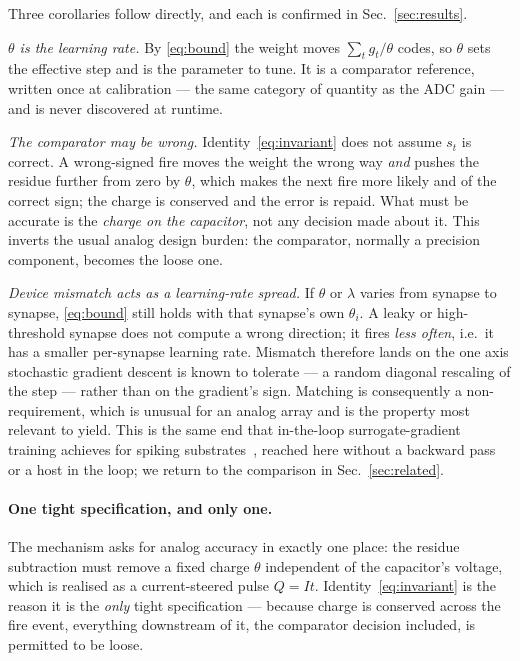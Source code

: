 \documentclass[11pt]{article}
\begin{document}
Three corollaries follow directly, and each is confirmed in Sec.~\ref{sec:results}.

\emph{$\theta$ is the learning rate.} By \eqref{eq:bound} the weight moves $\sum_t g_t/\theta$ codes,
so $\theta$ sets the effective step and is the parameter to tune. It is a comparator reference,
written once at calibration --- the same category of quantity as the ADC gain --- and is never
discovered at runtime.

\emph{The comparator may be wrong.} Identity~\eqref{eq:invariant} does not assume $s_t$ is correct. A
wrong-signed fire moves the weight the wrong way \emph{and} pushes the residue further from zero by
$\theta$, which makes the next fire more likely and of the correct sign; the charge is conserved and
the error is repaid. What must be accurate is the \emph{charge on the capacitor}, not any decision
made about it. This inverts the usual analog design burden: the comparator, normally a precision
component, becomes the loose one.

\emph{Device mismatch acts as a learning-rate spread.} If $\theta$ or $\lambda$ varies from synapse to
synapse, \eqref{eq:bound} still holds with that synapse's own $\theta_i$. A leaky or high-threshold
synapse does not compute a wrong direction; it fires \emph{less often}, i.e.\ it has a smaller
per-synapse learning rate. Mismatch therefore lands on the one axis stochastic gradient descent is
known to tolerate --- a random diagonal rescaling of the step --- rather than on the gradient's sign.
Matching is consequently a non-requirement, which is unusual for an analog array and is the property
most relevant to yield. This is the same end that in-the-loop surrogate-gradient training achieves for
spiking substrates~\cite{cramer2022surrogate}, reached here without a backward pass or a host in the
loop; we return to the comparison in Sec.~\ref{sec:related}.

\paragraph{One tight specification, and only one.} The mechanism asks for analog accuracy in exactly
one place: the residue subtraction must remove a fixed charge $\theta$ independent of the capacitor's
voltage, which is realised as a current-steered pulse $Q = It$. Identity~\eqref{eq:invariant} is the
reason it is the \emph{only} tight specification --- because charge is conserved across the fire event,
everything downstream of it, the comparator decision included, is permitted to be loose.
\end{document}
